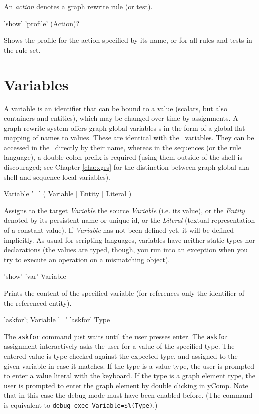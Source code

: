 An \emph{action} denotes a graph rewrite rule (or test).

\begin{rail}
  'show' 'profile' (Action)?
\end{rail}\label{secshellvariables}
Shows the profile for the action specified by its name, or for all rules and tests in the rule set.


\section{Variables}

A variable is an identifier that can be bound to a value (scalars, but also containers and entities), which may be changed over time by assignments.
A graph rewrite system offers graph global variables s in the form of a global flat mapping of names to values.
These are identical with the \GrShell\ variables.
They can be accessed in the \GrShell\ directly by their name, whereas in the sequences (or the rule language), a double colon prefix is required (using them outside of the shell is discouraged; see Chapter \ref{cha:xgrs} for the distinction between graph global aka shell and sequence local variables).

\begin{rail}
  Variable '=' ( Variable | Entity | Literal )
\end{rail}
Assigns to the target \emph{Variable} the source \emph{Variable} (i.e. its value), or the \emph{Entity} denoted by its persistent name or unique id, or the \emph{Literal} (textual representation of a constant value).
If \emph{Variable} has not been defined yet, it will be defined implicitly.
As usual for scripting languages, variables have neither static types nor declarations (the values are typed, though, you run into an exception when you try to execute an operation on a mismatching object).

\begin{rail}
'show' 'var' Variable
\end{rail}
Prints the content of the specified variable (for references only the identifier of the referenced entity).

\begin{rail}
  'askfor';
  Variable '=' 'askfor' Type
\end{rail}
The \texttt{askfor} command just waits until the user presses enter.
The \texttt{askfor} assignment interactively asks the user for a value of the specified type.
The entered value is type checked against the expected type, and assigned to the given variable in case it matches.
If the type is a value type, the user is prompted to enter a value literal with the keyboard.
If the type is a graph element type, the user is prompted to enter the graph element by double clicking in yComp.
Note that in this case the debug mode must have been enabled before.
(The command is equivalent to \verb#debug exec Variable=$%(Type)#.)

